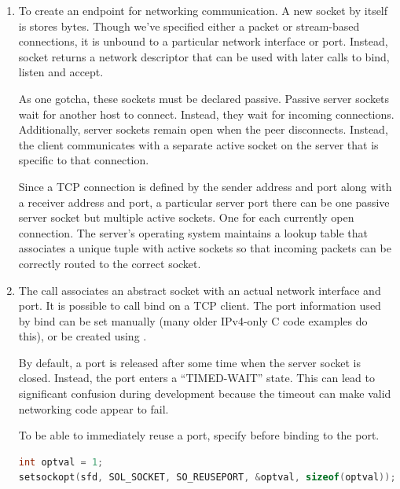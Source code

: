 \begin{enumerate}

  \item {}

  To create an endpoint for networking communication.
  A new socket by itself is stores bytes.
  Though we've specified either a packet or stream-based connections, it is unbound to a particular network interface or port.
  Instead, socket returns a network descriptor that can be used with later calls to bind, listen and accept.

  As one gotcha, these sockets must be declared passive.
  Passive server sockets wait for another host to connect.
  Instead, they wait for incoming connections.
  Additionally, server sockets remain open when the peer disconnects.
  Instead, the client communicates with a separate active socket on the server that is specific to that connection.

  Since a TCP connection is defined by the sender address and port along with a receiver address and port, a particular server port there can be one passive server socket but multiple active sockets.
  One for each currently open connection.
  The server's operating system maintains a lookup table that associates a unique tuple with active sockets so that incoming packets can be correctly routed to the correct socket.

  \item {}

  The  call associates an abstract socket with an actual network interface and port.
  It is possible to call bind on a TCP client.
  The port information used by bind can be set manually (many older IPv4-only C code examples do this), or be created using .

  By default, a port is released after some time when the server socket is closed.
  Instead, the port enters a ``TIMED-WAIT'' state.
  This can lead to significant confusion during development because the timeout can make valid networking code appear to fail.

  To be able to immediately reuse a port, specify  before binding to the port.

  \begin{lstlisting}[language=C]
int optval = 1;
setsockopt(sfd, SOL_SOCKET, SO_REUSEPORT, &optval, sizeof(optval));


\end{lstlisting}
\end{enumerate}
